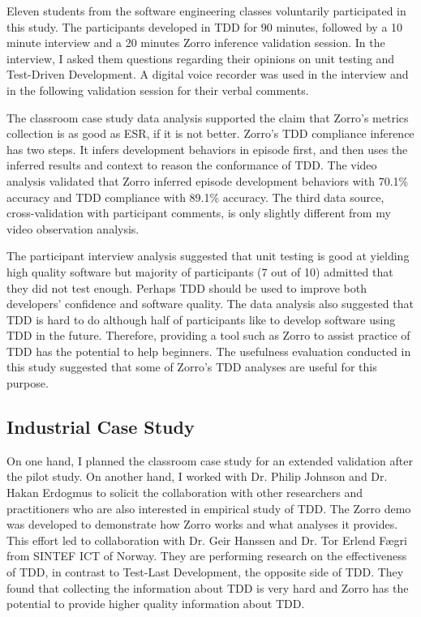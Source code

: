 Eleven students from the software engineering classes voluntarily participated in this study. The participants developed in TDD for 90 minutes, followed by a 10 minute interview and a 20 minutes Zorro inference validation session. In the interview, I asked them questions regarding their opinions on unit testing and Test-Driven Development. A digital voice recorder was used in the interview and in the following validation session for their verbal comments.

The classroom case study data analysis supported the claim that  Zorro's metrics collection is as good as ESR, if it is not better. Zorro's TDD compliance inference has two steps. It infers development behaviors in episode first, and then uses the inferred results and context to reason the conformance of TDD. The video analysis validated that Zorro inferred episode development behaviors with 70.1\% accuracy and TDD compliance with 89.1\% accuracy. The third data source, cross-validation with participant comments, is only slightly different from my video observation analysis. 

The participant interview analysis suggested that unit testing is good at yielding high quality software but majority of participants (7 out of 10) admitted that they did not test enough. Perhaps TDD should be used to improve both developers' confidence and software quality. The data analysis also suggested that TDD is hard to do although half of participants like to develop software using TDD in the future. Therefore, providing a tool such as Zorro to assist practice of TDD has the potential to help beginners. The usefulness evaluation conducted in this study suggested that some of Zorro's TDD analyses are useful for this purpose. 

\subsection{Industrial Case Study}
On one hand, I planned the classroom case study for an extended validation after the pilot study. On another hand, I worked with Dr. Philip Johnson and Dr. Hakan Erdogmus to solicit the collaboration with other researchers and practitioners who are also interested in empirical study of TDD. The Zorro demo \cite{ZorroDemo:06} was developed to demonstrate how Zorro works and what analyses it provides. This effort led to collaboration with Dr. Geir Hanssen and Dr. Tor Erlend F{\ae}gri from SINTEF ICT of Norway. They are performing research on the effectiveness of TDD, in contrast to Test-Last Development, the opposite side of TDD. They found that collecting the information about TDD is very hard and Zorro has the potential to provide higher quality information about TDD.

